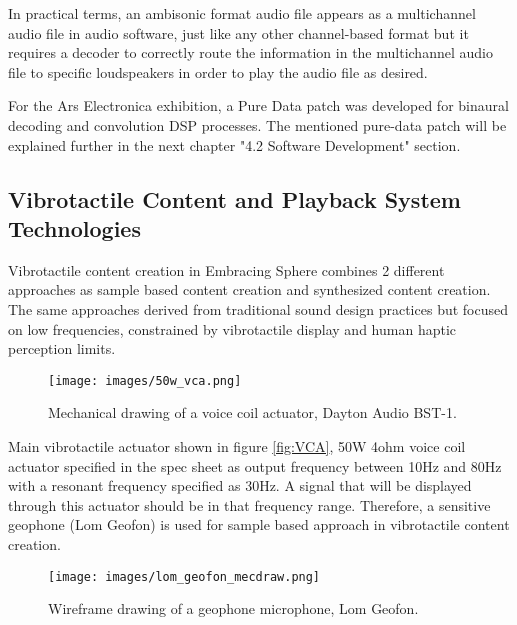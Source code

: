             In practical terms, an ambisonic format audio file appears as a multichannel audio file in audio software, just like any other channel-based format but it requires a decoder to correctly route the information in the multichannel audio file to specific loudspeakers in order to play the audio file as desired.\par

            For the Ars Electronica exhibition, a Pure Data patch was developed for binaural decoding and convolution DSP processes. The mentioned pure-data patch will be explained further in the next chapter "4.2 Software Development" section.\par
        \subsection{Vibrotactile Content and Playback System Technologies}
            Vibrotactile content creation in Embracing Sphere combines 2 different approaches as sample based content creation and synthesized content creation. The same approaches derived from traditional sound design practices but focused on low frequencies, constrained by vibrotactile display and human haptic perception limits.\par

            \begin{figure}[H]
                \centering
                \texttt{[image: images/50w\_vca.png]}
                \caption{Mechanical drawing of a voice coil actuator, Dayton Audio BST-1.}
                \label{fig:VCA_MECDRAW}
            \end{figure}

            Main vibrotactile actuator shown in figure \ref{fig:VCA}, 50W 4ohm voice coil actuator specified in the spec sheet as output frequency between 10Hz and 80Hz with a resonant frequency specified as 30Hz. A signal that will be displayed through this actuator should be in that frequency range. Therefore, a sensitive geophone (Lom Geofon) is used for sample based approach in vibrotactile content creation.\par

            \begin{figure}[H]
                \centering
                \texttt{[image: images/lom\_geofon\_mecdraw.png]}
                \caption{Wireframe drawing of a geophone microphone, Lom Geofon.}
                \label{fig:WF_GEOFON}
            \end{figure}

